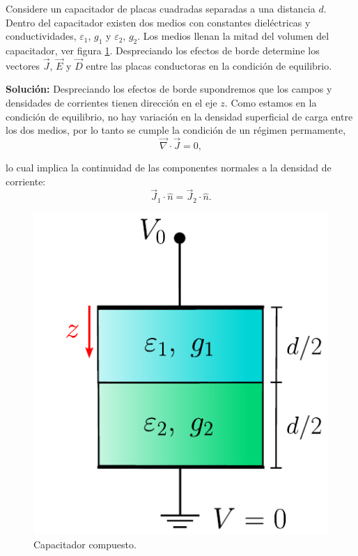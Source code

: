 \begin{ejemplo}
Considere un capacitador de placas cuadradas separadas a una distancia $d$. Dentro del capacitador existen dos medios con constantes dieléctricas y conductividades, $\varepsilon_1$, $g_1$ y $\varepsilon_2$, $g_2$. Los medios llenan la mitad del volumen del capacitador, ver figura \ref{fig:Ej-Cond-Borde-J}. Despreciando los efectos de borde determine los vectores $\Vec{J}$, $\Vec{E}$ y $\Vec{D}$ entre las placas conductoras en la condición de equilibrio.


    \textbf{Solución:} Despreciando los efectos de borde supondremos que los campos y densidades de corrientes tienen dirección en el eje $z$. Como estamos en la condición de equilibrio, no hay variación en la densidad superficial de carga entre los dos medios, por lo tanto se cumple la condición de un régimen permamente,
    $$\Vec{\nabla} \cdot \Vec{J} = 0,$$

    lo cual implica la continuidad de las componentes normales a la densidad de corriente:
    \begin{equation}
     \Vec{J}_1 \cdot \hat{n} = \Vec{J}_2 \cdot \hat{n}.   \label{Ej-CB-J-1}
    \end{equation}
    
    \begin{figure}[H]
        \centering
        \includegraphics[scale = 0.7]{Figuras/El-Condicion-Borde-J.pdf}
        \caption{Capacitador compuesto.}
        \label{fig:Ej-Cond-Borde-J}
    \end{figure}
    

\end{ejemplo}
